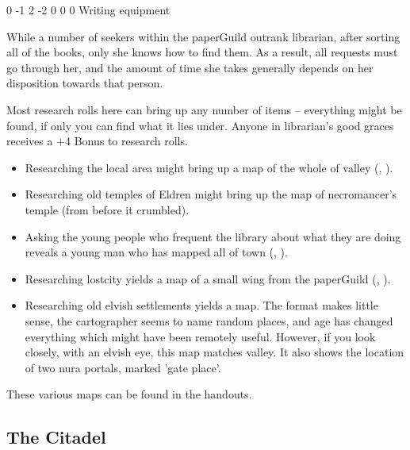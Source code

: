 \begin{multicols}{2}

{0}%
{-1}%
{{2}%
{-2}%
{0}}%
{0}%
{0}%
{}%
{Writing equipment}%
{
  \setcounter{Academics}{3}
  \setcounter{Crafts}{1}
  \setcounter{Empathy}{1}
}

While a number of \glspl{seeker} within the \gls{paperGuild} outrank \gls{librarian}, after sorting all of the books, only she knows how to find them.
As a result, all requests must go through her, and the amount of time she takes generally depends on her disposition towards that person.

Most research rolls here can bring up any number of items -- everything might be found, if only you can find what it lies under.
Anyone in \gls{librarian}'s good graces receives a +4 Bonus to research rolls.

\begin{itemize}
  \item
  Researching the local area might bring up a map of the whole of \gls{valley} (, \tn[14]).
  \item
  Researching old temples of Eldren might bring up the map of \gls{necromancer}'s temple (from before it crumbled).
  \item
  Asking the young people who frequent the library about what they are doing reveals a young man who has mapped all of \gls{town} (, \tn[10]).
  \item
  Researching \gls{lostcity} yields a map of a small wing from the \gls{paperGuild} (, \tn[18]).
  \item
  Researching old elvish settlements yields a map.
  The format makes little sense, the cartographer seems to name random places, and age has changed everything which might have been remotely useful.
  However, if you look closely, with an elvish eye, this map matches \gls{valley}.
  It also shows the location of two nura portals, marked 'gate place'.
\end{itemize}

These various maps can be found in the handouts.

\subsection{The Citadel}
\label{citadel}


\end{multicols}
